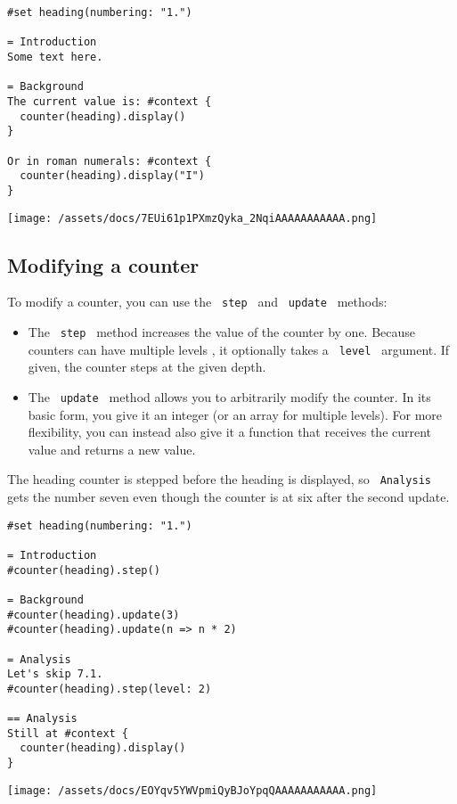 \begin{verbatim}
#set heading(numbering: "1.")

= Introduction
Some text here.

= Background
The current value is: #context {
  counter(heading).display()
}

Or in roman numerals: #context {
  counter(heading).display("I")
}
\end{verbatim}

\texttt{[image: /assets/docs/7EUi61p1PXmzQyka\_2NqiAAAAAAAAAAA.png]}

\subsection{Modifying a counter}\label{modifying}

To modify a counter, you can use the \texttt{\ step\ } and
\texttt{\ update\ } methods:

\begin{itemize}
\item
  The \texttt{\ step\ } method increases the value of the counter by
  one. Because counters can have multiple levels , it optionally takes a
  \texttt{\ level\ } argument. If given, the counter steps at the given
  depth.
\item
  The \texttt{\ update\ } method allows you to arbitrarily modify the
  counter. In its basic form, you give it an integer (or an array for
  multiple levels). For more flexibility, you can instead also give it a
  function that receives the current value and returns a new value.
\end{itemize}

The heading counter is stepped before the heading is displayed, so
\texttt{\ Analysis\ } gets the number seven even though the counter is
at six after the second update.

\begin{verbatim}
#set heading(numbering: "1.")

= Introduction
#counter(heading).step()

= Background
#counter(heading).update(3)
#counter(heading).update(n => n * 2)

= Analysis
Let's skip 7.1.
#counter(heading).step(level: 2)

== Analysis
Still at #context {
  counter(heading).display()
}
\end{verbatim}

\texttt{[image: /assets/docs/EOYqv5YWVpmiQyBJoYpqQAAAAAAAAAAA.png]}

